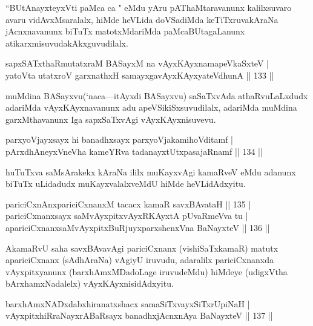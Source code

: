 \begin{artha}
``BUtAnayxteyxVti paMca ca " eMdu yAru pAThaMtaravanunx kalilxsuvaro avaru vidAvxMsaralalx, hiMde heVLida doVSadiMda keTiTxruvakAraNa jAcnxnavanunx biTuTx matotxMdariMda paMcaBUtagaLanunx atikarxmisuvudakAkxguvudilalx.
\end{artha}

\begin{shl}
sapxSATxthaRmutatxraM BASayxM na vAyxKAyxnamapeVkaSxteV |\\
yatoV\s ta utatxroV garxnathxH samayxgavAyxKAyxyateV\s dhunA \hfill || 133 ||
\end{shl}

\begin{artha}
muMdina BASayxvu(`naca---itAyxdi BASayxvu) saSaTxvAda athaRvuLaLxdudx adariMda vAyxKAyxnavanunx adu apeVSikiSxsuvudilalx, adariMda muMdina garxMthavanunx Iga sapxSaTxvAgi vAyxKAyxnisuvevu.
\end{artha}

\begin{shl}
parxyoVjayxsayx hi banadhxsayx parxyoVjakamihoVditamf |\\
pArxdhAneyxVneVha kameYRva tadanayxtUtxpasajaRnamf \hfill || 134 ||
\end{shl}

\begin{artha}
huTuTxva saMsArakekx kAraNa ililx muKayxvAgi kamaRveV eMdu adanunx biTuTx uLidadudx muKayxvalalxveMdU hiMde heVLidAdxyitu.
\end{artha}

\begin{shl}
pariciCxnAnxpariciCxnanxM tacacx kamaR savxBAvataH \hfill || 135 |\\
pariciCxnanxsayx saMvAyxpitxvAyxRKAyxtA pUvaRmeVva tu |\\
apariciCxnanxsaMvAyxpitxBuRjuyxparxshenxVna BaNayxteV \hfill || 136 ||
\end{shl}

\begin{artha}
AkamaRvU saha savxBAvavAgi pariciCxnanx (vishiSaTxkamaR) matutx apariciCxnanx  (sAdhAraNa) vAgiyU iruvudu, adaralilx pariciCxnanxda vAyxpitxyanunx (barxhAmxMDadoLage iruvudeMdu) hiMdeye (udigxVtha bArxhamxNadalelx) vAyxKAyxnisidAdxyitu.
\end{artha}


\begin{shl}
barxhAmxNADxdabxhiranatxshacx samaSiTxvayxSiTxrUpiNaH |\\
vAyxpitxhiRraNayxrABaRsayx banadhxjAcnxnAya BaNayxteV \hfill || 137 ||
\end{shl}

